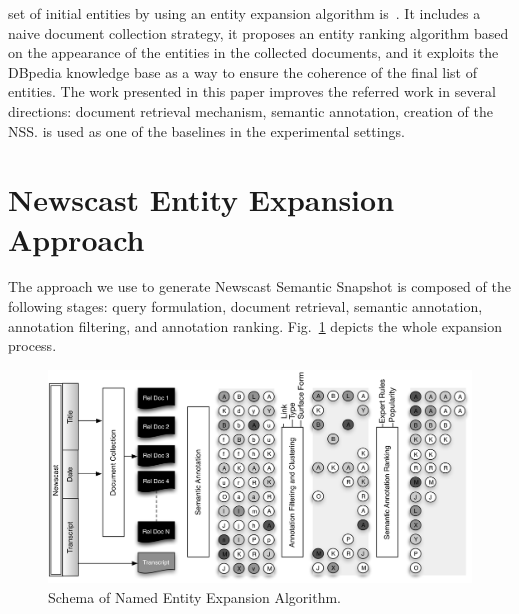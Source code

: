 \documentclass{llncs}
\newcommand{\hg}[1]{\colorbox{yellow}{#1}}
\begin{document}
set of initial entities by using an entity expansion algorithm is~\cite{RedondoGarcia2014}. It includes a naive document collection strategy, it proposes an entity ranking algorithm based on the appearance of the entities in the collected documents, and it exploits the DBpedia knowledge base as a way to ensure the coherence of the final list of entities. The work presented in this paper improves the referred work in several directions: document retrieval mechanism, semantic annotation, creation of the NSS. \cite{RedondoGarcia2014} is used as one of the baselines in the experimental settings.%

\section{Newscast Entity Expansion Approach}
\label{sec:Approach}
The approach we use to generate Newscast Semantic Snapshot is composed of the following stages: query formulation, document retrieval, semantic annotation, annotation filtering, and annotation ranking. Fig.~\ref{fig:namedEntityExpansion} depicts the whole expansion process.
\begin{figure}[h!]
\centering
\includegraphics[width=1\textwidth]{figure/ExpansionDiagram}
\caption{Schema of Named Entity Expansion Algorithm.}
\label{fig:namedEntityExpansion}%
\end{figure}
\end{document}

